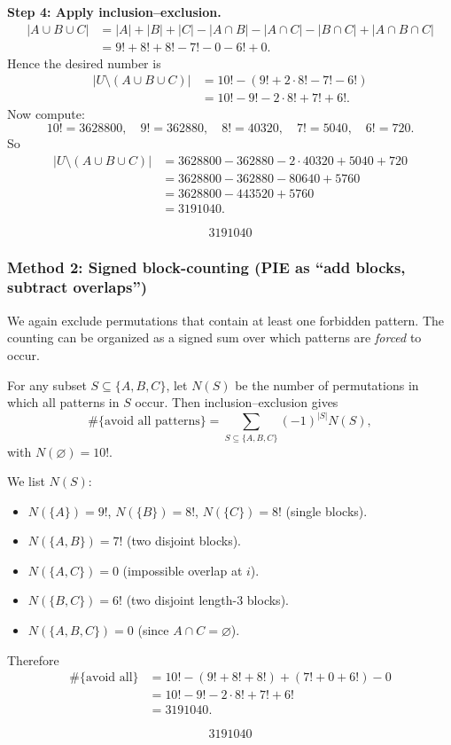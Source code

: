\documentclass[12pt]{article}
\begin{document}
\medskip
\noindent\textbf{Step 4: Apply inclusion--exclusion.}
\begin{align*}
|A\cup B\cup C|
&= |A|+|B|+|C| - |A\cap B| - |A\cap C| - |B\cap C| + |A\cap B\cap C|\\
&= 9! + 8! + 8! - 7! - 0 - 6! + 0.
\end{align*}
Hence the desired number is
\begin{align*}
|U\setminus(A\cup B\cup C)|
&= 10! - (9! + 2\cdot 8! - 7! - 6!)\\
&= 10! - 9! - 2\cdot 8! + 7! + 6!.
\end{align*}
Now compute:
\[
10!=3628800,\quad 9!=362880,\quad 8!=40320,\quad 7!=5040,\quad 6!=720.
\]
So
\begin{align*}
|U\setminus(A\cup B\cup C)|
&= 3628800 - 362880 - 2\cdot 40320 + 5040 + 720\\
&= 3628800 - 362880 - 80640 + 5760\\
&= 3628800 - 443520 + 5760\\
&= 3191040.
\end{align*}

\[
\boxed{3191040}
\]

\subsubsection{Method 2: Signed block-counting (PIE as ``add blocks, subtract overlaps'')}
We again exclude permutations that contain at least one forbidden pattern. The counting can be organized as a signed sum over which patterns are \emph{forced} to occur.

For any subset $S\subseteq\{A,B,C\}$, let $N(S)$ be the number of permutations in which all patterns in $S$ occur. Then inclusion--exclusion gives
\[
\#\{\text{avoid all patterns}\}=\sum_{S\subseteq\{A,B,C\}} (-1)^{|S|} N(S),
\]
with $N(\varnothing)=10!$.

We list $N(S)$:
\begin{itemize}[leftmargin=*]
\item $N(\{A\})=9!$, $N(\{B\})=8!$, $N(\{C\})=8!$ (single blocks).
\item $N(\{A,B\})=7!$ (two disjoint blocks).
\item $N(\{A,C\})=0$ (impossible overlap at $i$).
\item $N(\{B,C\})=6!$ (two disjoint length-$3$ blocks).
\item $N(\{A,B,C\})=0$ (since $A\cap C=\varnothing$).
\end{itemize}

Therefore
\begin{align*}
\#\{\text{avoid all}\}
&= 10! - (9!+8!+8!) + (7!+0+6!) - 0\\
&= 10! - 9! - 2\cdot 8! + 7! + 6!\\
&= 3191040.
\end{align*}

\[
\boxed{3191040}
\]
\end{document}
